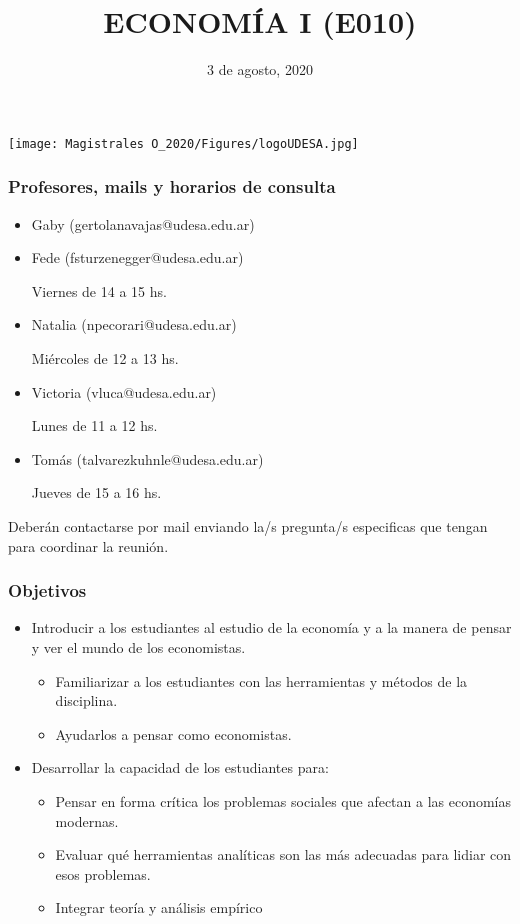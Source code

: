 \documentclass[14pt]{beamer}
\title{ECONOM\'{I}A I (E010)}
\date{3 de agosto, 2020}
\begin{document}
\begin{frame}
\titlepage
\centering
\texttt{[image: Magistrales O\_2020/Figures/logoUDESA.jpg]} 
\end{frame}

\begin{frame}
\frametitle{Profesores, mails y horarios de consulta}
\begin{itemize}
    \item Gaby (gertolanavajas@udesa.edu.ar)
    \item Fede (fsturzenegger@udesa.edu.ar)
    \begin{itemize}
    Viernes de 14 a 15 hs.
    \end{itemize} \vspace{2mm}
    \item Natalia (npecorari@udesa.edu.ar)
    \begin{itemize}
    Miércoles de 12 a 13 hs. 
    \end{itemize} \vspace{2mm}
    \item Victoria (vluca@udesa.edu.ar)
    \begin{itemize}
    Lunes de 11 a 12 hs.
    \end{itemize}
    \item Tomás (talvarezkuhnle@udesa.edu.ar)
    \begin{itemize}
    Jueves de 15 a 16 hs. 
    \end{itemize}
\end{itemize}
Deberán contactarse por mail enviando la/s pregunta/s especificas que tengan para coordinar la reunión.
\end{frame}

\begin{frame}
\frametitle{Objetivos}
\begin{itemize}
    \item Introducir a los estudiantes al estudio de la economía y a la manera de pensar y ver el mundo de los economistas.
    \begin{itemize}
        \item Familiarizar a los estudiantes con las herramientas y métodos de la disciplina.
        \item Ayudarlos a pensar como economistas. 
    \end{itemize}
\item Desarrollar la capacidad de los estudiantes para:
    \begin{itemize}
        \item Pensar en forma crítica los problemas sociales que afectan a las economías modernas.
        \item Evaluar qué herramientas analíticas son las más adecuadas para lidiar con esos problemas.
        \item Integrar teoría y análisis empírico 
    \end{itemize}    
\end{itemize}
\end{frame}
\end{document}
